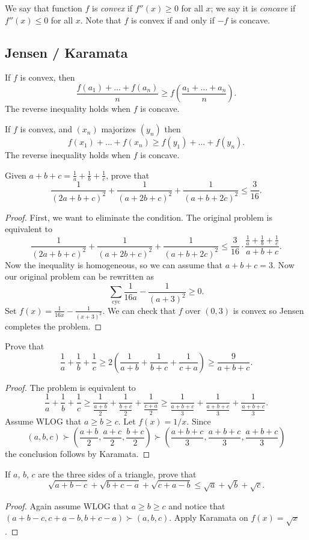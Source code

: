 \documentclass[11pt]{scrartcl}
\begin{document}
We say that function $f$ is \emph{convex} if $f''(x) \ge 0$ for all $x$; we say it is \emph{concave} if $f''(x) \le 0$ for all $x$.
Note that $f$ is convex if and only if $-f$ is concave.

\subsection{Jensen / Karamata}
\begin{theorem}
	 If $f$ is convex, then
	\[ \frac{f(a_1) + \dots + f(a_n)}{n} \ge f\left( \frac{a_1+\dots+a_n}{n} \right). \]
	The reverse inequality holds when $f$ is concave.
\end{theorem}
\begin{theorem}
	 If $f$ is convex, and $(x_n)$ majorizes $(y_n)$ then
	\[ f(x_1) + \dots + f(x_n) \ge f(y_1) + \dots + f(y_n). \]
	The reverse inequality holds when $f$ is concave.
\end{theorem}
\begin{example}
	[Shortlist 2009] Given $a+b+c=\frac1a+\frac1b+\frac1c$, prove that
	\[ \frac{1}{(2a+b+c)^2}+\frac{1}{(a+2b+c)^2}+\frac{1}{(a+b+2c)^2}\leq\frac{3}{16}. \]
\end{example}
\begin{proof}
	First, we want to eliminate the condition.
	The original problem is equivalent to
	\[ \frac{1}{(2a+b+c)^2}+\frac{1}{(a+2b+c)^2}+\frac{1}{(a+b+2c)^2}\leq\frac{3}{16} \cdot \frac{\frac1a+\frac1b+\frac1c}{a+b+c}. \]
	Now the inequality is homogeneous, so we can assume that $a+b+c=3$.
	Now our original problem can be rewritten as
	\[ \sum_{\text{cyc}} \frac{1}{16a} - \frac{1}{(a+3)^2} \ge 0. \]
	Set $f(x) = \frac{1}{16x} - \frac{1}{(x+3)^2}$. We can check that $f$ over $(0,3)$ is convex so Jensen completes the problem.
\end{proof}
\begin{example}
	Prove that \[ \frac{1}{a}+\frac{1}{b}+\frac{1}{c}\geq2\left(\frac{1}{a+b}+\frac{1}{b+c}+\frac{1}{c+a}\right)\geq\frac{9}{a+b+c}. \]
\end{example}
\begin{proof}
	The problem is equivalent to
	\[ \frac{1}{a} + \frac{1}{b} + \frac{1}{c} \ge \frac{1}{\frac{a+b}{2}} + \frac{1}{\frac{b+c}{2}} + \frac{1}{\frac{c+a}{2}} \ge \frac{1}{\frac{a+b+c}{3}} + \frac{1}{\frac{a+b+c}{3}} + \frac{1}{\frac{a+b+c}{3}}. \]
	Assume WLOG that $a \ge b \ge c$. Let $f(x) = 1/x$. Since
	\[ (a,b,c) \succ \left( \frac{a+b}{2}, \frac{a+c}{2}, \frac{b+c}{2} \right) \succ \left( \frac{a+b+c}{3}, \frac{a+b+c}{3}, \frac{a+b+c}{3} \right) \]
	the conclusion follows by Karamata.
\end{proof}
\begin{example}
	[APMO 1996] If $a$, $b$, $c$ are the three sides of a triangle, prove that \[ \sqrt{a+b-c}+\sqrt{b+c-a}+\sqrt{c+a-b}\leq\sqrt{a}+\sqrt{b}+\sqrt{c}. \]
\end{example}
\begin{proof}
	Again assume WLOG that $a \ge b \ge c$ and notice that $(a+b-c,c+a-b,b+c-a) \succ (a,b,c)$. Apply Karamata on $f(x) = \sqrt x$.
\end{proof}
\end{document}
